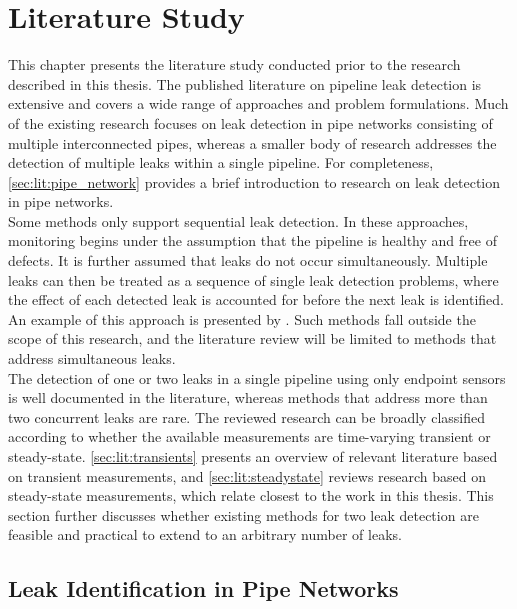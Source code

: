 \chapter{Literature Study}
\label{chap:literature}

This chapter presents the literature study conducted prior to the research described in this thesis. The published literature on pipeline leak detection is extensive and covers a wide range of approaches and problem formulations. Much of the existing research focuses on leak detection in pipe networks consisting of multiple interconnected pipes, whereas a smaller body of research addresses the detection of multiple leaks within a single pipeline. For completeness, \autoref{sec:lit:pipe_network} provides a brief introduction to research on leak detection in pipe networks.\\

Some methods only support sequential leak detection. In these approaches, monitoring begins under the assumption that the pipeline is healthy and free of defects. It is further assumed that leaks do not occur simultaneously. Multiple leaks can then be treated as a sequence of single leak detection problems, where the effect of each detected leak is accounted for before the next leak is identified. An example of this approach is presented by \cite{verde2005}. Such methods fall outside the scope of this research, and the literature review will be limited to methods that address simultaneous leaks.\\

The detection of one or two leaks in a single pipeline using only endpoint sensors is well documented in the literature, whereas methods that address more than two concurrent leaks are rare. The reviewed research can be broadly classified according to whether the available measurements are time-varying transient or steady-state. \autoref{sec:lit:transients} presents an overview of relevant literature based on transient measurements, and \autoref{sec:lit:steadystate} reviews research based on steady-state measurements, which relate closest to the work in this thesis. This section further discusses whether existing methods for two leak detection are feasible and practical to extend to an arbitrary number of leaks.

\newpage
\section{Leak Identification in Pipe Networks}
\label{sec:lit:pipe_network}

